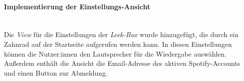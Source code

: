 \documentclass[10pt, a4paper]{article}
\begin{document}
\begin{onehalfspace}
\paragraph*{Implementierung der Einstellungs-Ansicht} $~$ \\
Die \textit{View} für die Einstellungen der \textit{Leek-Box} wurde hinzugefügt, die durch ein Zahnrad auf der Startseite aufgerufen werden kann.
In diesen Einstellungen können die Nutzer:innen den Lautsprecher für die Wiedergabe auswählen. Außerdem enthält die Ansicht die Email-Adresse des aktiven Spotify-Accounts und einen Button zur Abmeldung.


\end{onehalfspace}
\end{document}

